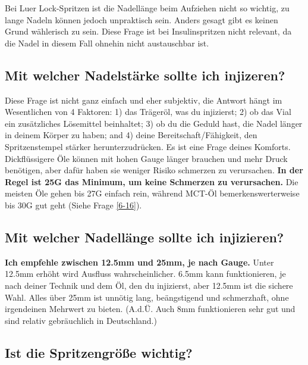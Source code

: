 \documentclass{article}
\begin{document}
Bei Luer Lock-Spritzen ist die Nadellänge beim Aufziehen nicht so wichtig, zu lange Nadeln können jedoch unpraktisch sein. Anders gesagt gibt es keinen Grund wählerisch zu sein. Diese Frage ist bei Insulinspritzen nicht relevant, da die Nadel in diesem Fall ohnehin nicht austauschbar ist.

\subsection{Mit welcher Nadelstärke sollte ich injizeren?}\label{5-16}

Diese Frage ist nicht ganz einfach und eher subjektiv, die Antwort hängt im Wesentlichen von 4 Faktoren: 1) das Trägeröl, was du injizierst; 2) ob das Vial ein zusätzliches Lösemittel beinhaltet; 3) ob du die Geduld hast, die Nadel länger in deinem Körper zu haben; and 4) deine Bereitschaft/Fähigkeit, den Spritzenstempel stärker herunterzudrücken. Es ist eine Frage deines Komforts. Dickflüssigere Öle können mit hohen Gauge länger brauchen und mehr Druck benötigen, aber dafür haben sie weniger Risiko schmerzen zu verursachen. \textbf{In der Regel ist 25G das Minimum, um keine Schmerzen zu verursachen. }Die meisten Öle gehen bis 27G einfach rein, während MCT-Öl bemerkenswerterweise bis 30G gut geht (Siehe Frage \ref{6-16}).

\subsection{Mit welcher Nadellänge sollte ich injizieren?}

\textbf{Ich empfehle zwischen 12.5mm und 25mm, je nach Gauge.} Unter 12.5mm erhöht wird Ausfluss wahrscheinlicher. 6.5mm kann funktionieren, je nach deiner Technik und dem Öl, den du injizierst, aber 12.5mm ist die sichere Wahl. Alles über 25mm ist unnötig lang, beängstigend und schmerzhaft, ohne irgendeinen Mehrwert zu bieten. (A.d.Ü. Auch 8mm funktionieren sehr gut und sind relativ gebräuchlich in Deutschland.)

\subsection{Ist die Spritzengröße wichtig?}
\end{document}
